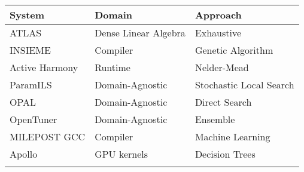 \begin{table}
    \centering
    \begin{tabular}{@{}lll@{}}
        \toprule
        System & Domain & Approach \\ \midrule
        \rowcolor{red!25} ATLAS & Dense Linear Algebra & Exhaustive\\ \addlinespace
        \rowcolor{green!25} INSIEME & Compiler & Genetic Algorithm \\
        \rowcolor{green!25} Active Harmony & Runtime & Nelder-Mead \\
        \rowcolor{green!25} ParamILS & Domain-Agnostic & Stochastic Local Search \\
        \rowcolor{green!25} OPAL & Domain-Agnostic & Direct Search \\
        \rowcolor{green!25} OpenTuner & Domain-Agnostic & Ensemble \\ \addlinespace
        \rowcolor{cyan!25} MILEPOST GCC & Compiler & Machine Learning \\
        \rowcolor{cyan!25} Apollo & GPU kernels & Decision Trees \\ \addlinespace
        \bottomrule
    \end{tabular}
\end{table}
